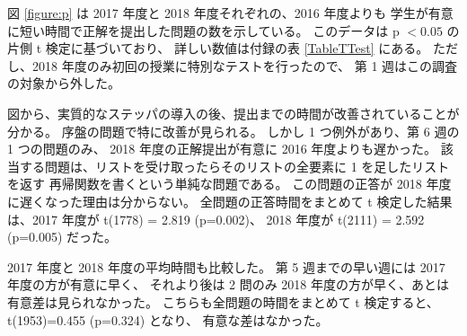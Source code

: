 図 \ref{figure:p} は
2017 年度と 2018 年度それぞれの、2016 年度よりも
学生が有意に短い時間で正解を提出した問題の数を示している。
このデータは p $< 0.05$ の片側 t 検定に基づいており、
詳しい数値は付録の表 \ref{TableTTest} にある。
ただし、2018 年度のみ初回の授業に特別なテストを行ったので、
第 1 週はこの調査の対象から外した。

図から、実質的なステッパの導入の後、提出までの時間が改善されていることが分かる。
序盤の問題で特に改善が見られる。
しかし 1 つ例外があり、第 6 週の 1 つの問題のみ、
2018 年度の正解提出が有意に 2016 年度よりも遅かった。
該当する問題は、リストを受け取ったらそのリストの全要素に 1 を足したリストを返す
再帰関数を書くという単純な問題である。
この問題の正答が 2018 年度に遅くなった理由は分からない。
全問題の正答時間をまとめて t 検定した結果は、2017 年度が t(1778) = 2.819 (p=0.002)、
2018 年度が t(2111) = 2.592 (p=0.005) だった。

2017 年度と 2018 年度の平均時間も比較した。
第 5 週までの早い週には 2017 年度の方が有意に早く、
それより後は 2 問のみ 2018 年度の方が早く、あとは有意差は見られなかった。
こちらも全問題の時間をまとめて t 検定すると、t(1953)=0.455 (p=0.324) となり、
有意な差はなかった。


